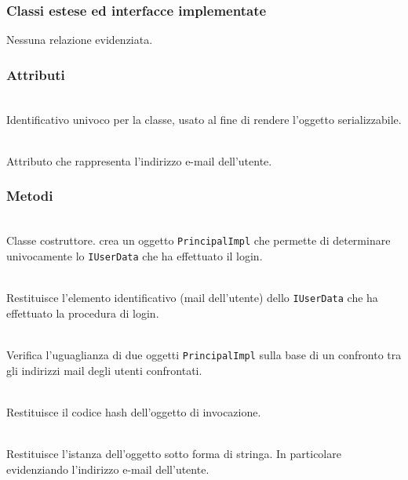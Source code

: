 \subsubsection*{Classi estese ed interfacce implementate}

Nessuna relazione evidenziata.

\subsubsection*{Attributi}
\begin{description}
  \item{}\\
  Identificativo univoco per la classe, usato al fine di rendere l'oggetto serializzabile.
  \item{}\\
  Attributo che rappresenta l'indirizzo e-mail dell'utente.
\end{description}

\subsubsection*{Metodi}
\begin{description}
	\item{}\\
	Classe costruttore. crea un oggetto \texttt{PrincipalImpl} che permette di determinare univocamente lo \texttt{IUserData} che ha effettuato il login.
	\item{}\\
	Restituisce l'elemento identificativo (mail dell'utente) dello \texttt{IUserData} che ha effettuato la procedura di login.
	\item{}\\
	Verifica l'uguaglianza di due oggetti \texttt{PrincipalImpl} sulla base di un confronto tra gli indirizzi mail degli utenti confrontati.
	\item{}\\
	Restituisce il codice hash dell'oggetto di invocazione.				\item{}\\
	Restituisce l'istanza dell'oggetto sotto forma di stringa. In particolare evidenziando l'indirizzo e-mail dell'utente.
\end{description}

